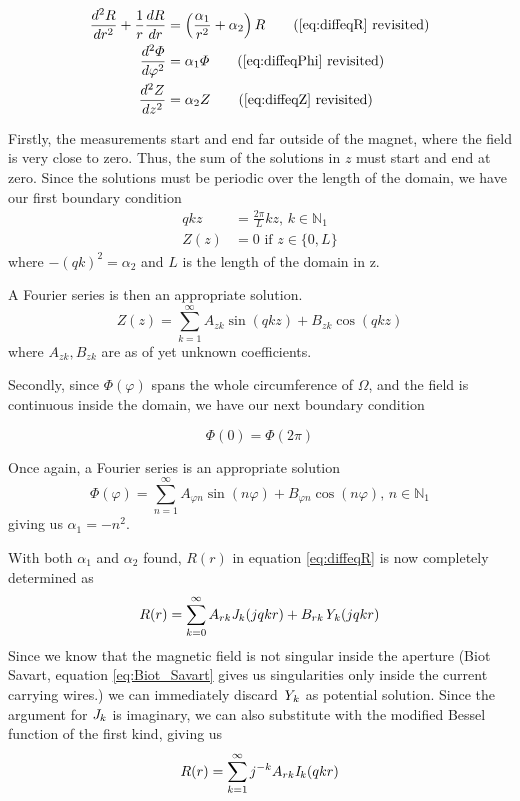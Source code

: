 \begin{align*}
    \frac{d^2R}{dr^2} + \frac{1}{r} \frac{dR}{dr} & =
    \left( \frac{\alpha_1}{r^2} + \alpha_2 \right)R
    \tag{\ref{eq:diffeqR} revisited}                                  \\
    \frac{d^2 \varPhi}{d\varphi^2}                & = \alpha_1\varPhi
    \tag{\ref{eq:diffeqPhi} revisited}                                \\
    \frac{d^2 Z}{dz^2}                            & = \alpha_2 Z
    \tag{\ref{eq:diffeqZ} revisited}
\end{align*}

Firstly, the measurements start and end far outside of the magnet,
where the field is very close to zero. Thus, the sum of the solutions
in $z$ must start and end at zero. Since the solutions must be periodic
over the length of the domain, we have our first boundary condition
\begin{align}
    qkz  & = \frac{2\pi}{L}kz, \,k\in\mathbb{N}_1 \\
    Z(z) & = 0\text{ if } z\in\{0,L\}
\end{align}
where $-(qk)^2 = \alpha_2$ and $L$ is the length of the domain in z.

A Fourier series is then an appropriate solution.
\begin{equation}
    Z(z) = \sum\limits_{k=1}^{\infty}
    A_{zk}\sin{(qkz)} + B_{zk}\cos{(qkz)}
\end{equation}
where $A_{zk}, B_{zk}$ are as of yet unknown coefficients.

Secondly, since $\varPhi(\varphi)$ spans the whole circumference of
$\Omega$, and the field is continuous inside the domain, we have
our next boundary condition

\begin{equation}
    \varPhi(0) = \varPhi(2\pi)
\end{equation}

Once again, a Fourier series is an appropriate solution
\begin{equation}
    \varPhi(\varphi) = \sum\limits_{n=1}^{\infty}
    A_{\varphi n}\sin{(n\varphi)} + B_{\varphi n}\cos{(n\varphi)}
    , \, n\in\mathbb{N}_1
\end{equation}
giving us $\alpha_1 = -n^2$.

With both $\alpha_1$ and $\alpha_2$ found, $R(r)$ in equation \ref{eq:diffeqR}
is now completely determined as
\begin{equation}
    R(r) = \sum\limits_{k=0}^{\infty}
    A_{rk}\mathit{J}_{k}(jqkr) + B_{rk}\mathit{Y}_{k}(jqkr)
\end{equation}
Since we know that the magnetic field is not singular inside the aperture
(Biot Savart, equation \ref{eq:Biot_Savart} gives us singularities only inside
the current carrying wires.) we can immediately discard $\mathit{Y}_{k}$ as potential
solution. Since the argument for $\mathit{J}_{k}$ is imaginary, we can also substitute
with the modified Bessel function of the first kind, giving us
\begin{equation}
    R(r) = \sum\limits_{k=1}^{\infty}
    j^{-k}A_{rk}\mathit{I}_{k}(qkr)
\end{equation}

